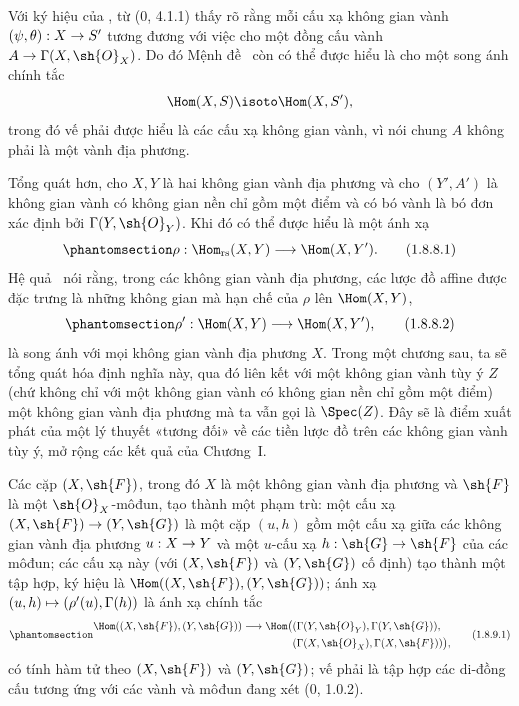 \documentclass[oneside,10pt]{amsart}
\makeatletter
\newcommand{\ega@arrow}[2]{\mathchoice{#1}{#2}{#2}{#2}}
\let\ega@shortmapsto\mapsto
\renewcommand{\to}{\ega@arrow{\longrightarrow}{\rightarrow}}
\renewcommand{\mapsto}{\ega@arrow{\longmapsto}{\ega@shortmapsto}}
\newcommand{\oldpage}[2][]{\marginnote{\normalfont\footnotesize\textbf{#1}~|~#2}\ignorespaces}
\let\EGAOriginalLabel\label
\renewcommand{\label}[1]{\phantomsection\EGAOriginalLabel{#1}}
\makeatother
\begin{document}
\begin{env}[1.8.8]
\label{ega2:addendum:I.1.8.8}
Với ký hiệu của , từ (0, 4.1.1) thấy rõ rằng mỗi cấu xạ
không gian vành $(\psi,\theta):X\to S'$ tương đương với việc cho một
đồng cấu vành $A\to\Gamma(X,\sh{O}_X)$. Do đó
Mệnh đề~ còn có thể được hiểu là cho một song ánh chính
tắc
\[
  \Hom(X,S)\isoto\Hom(X,S'),
\]
trong đó vế phải được hiểu là các cấu xạ không gian vành, vì nói chung
$A$ không phải là một vành địa phương.

Tổng quát hơn, cho $X,Y$ là hai không gian vành địa phương và cho
$(Y',A')$ là không gian vành có không gian nền chỉ gồm một điểm và có
bó vành là bó đơn xác định bởi $\Gamma(Y,\sh{O}_Y)$. Khi đó
 có thể được hiểu là một ánh xạ
\begin{equation}
\label{ega2:addendum:I.1.8.8.1}
  \rho:\Hom_{\mathrm{rs}}(X,Y)\to\Hom(X,Y').
\tag{1.8.8.1}
\end{equation}
Hệ quả~ nói rằng, trong các không gian vành địa phương,
các lược đồ affine được đặc trưng là những không gian mà hạn chế của
$\rho$ lên $\Hom(X,Y)$,
\begin{equation}
\label{ega2:addendum:I.1.8.8.2}
  \rho':\Hom(X,Y)\to\Hom(X,Y'),
\tag{1.8.8.2}
\end{equation}
là song ánh với mọi không gian vành địa phương $X$. Trong một chương
sau, ta sẽ tổng quát hóa định nghĩa này, qua đó liên kết với một không
gian vành tùy ý $Z$ (chứ không chỉ với một không gian vành có không
gian nền chỉ gồm một điểm) một không gian vành địa phương mà ta vẫn
gọi là $\Spec(Z)$. Đây sẽ là điểm xuất phát của một lý thuyết
«tương đối» về các tiền lược đồ trên các không gian vành tùy ý, mở
rộng các kết quả của Chương~I.
\end{env}

\begin{env}[1.8.9]
\label{ega2:addendum:I.1.8.9}
Các cặp $(X,\sh{F})$, trong đó $X$ là một không gian vành địa phương
và $\sh{F}$ là một $\sh{O}_X$-môđun, tạo thành một phạm trù: một cấu
xạ $(X,\sh{F})\to(Y,\sh{G})$ là một cặp $(u,h)$ gồm một cấu xạ
\oldpage[II]{221}
giữa các không gian vành địa phương $u:X\to Y$ và một $u$-cấu xạ
$h:\sh{G}\to\sh{F}$ của các môđun; các
cấu xạ này (với $(X,\sh{F})$ và $(Y,\sh{G})$ cố định) tạo thành một tập
hợp, ký hiệu là $\Hom((X,\sh{F}),(Y,\sh{G}))$; ánh xạ
$(u,h)\mapsto(\rho'(u),\Gamma(h))$ là ánh xạ chính tắc
\begin{equation}
\label{ega2:addendum:I.1.8.9.1}
\begin{split}
  \Hom((X,\sh{F}),(Y,\sh{G}))\to
  \Hom\bigl(
    &(\Gamma(Y,\sh{O}_Y),\Gamma(Y,\sh{G})),\\
    &(\Gamma(X,\sh{O}_X),\Gamma(X,\sh{F}))
  \bigr),
\end{split}
\tag{1.8.9.1}
\end{equation}
có tính hàm tử theo $(X,\sh{F})$ và $(Y,\sh{G})$; vế phải là tập hợp
các di-đồng cấu tương ứng với các vành và môđun đang xét (0, 1.0.2).
\end{env}
\end{document}

